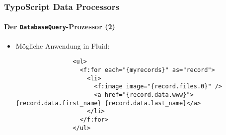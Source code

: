 \begin{frame}[fragile]
	\frametitle{TypoScript Data Processors}
	\framesubtitle{Der \texttt{DatabaseQuery}-Prozessor (2)}

	\lstset{basicstyle=\tiny\ttfamily}

	\begin{itemize}

		\item Mögliche Anwendung in Fluid:

			\begin{lstlisting}
				<ul>
				  <f:for each="{myrecords}" as="record">
				    <li>
				      <f:image image="{record.files.0}" />
				      <a href="{record.data.www}">{record.data.first_name} {record.data.last_name}</a>
				    </li>
				  </f:for>
				</ul>
			\end{lstlisting}

	\end{itemize}

\end{frame}

